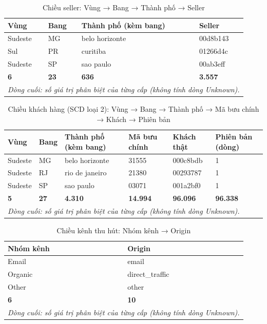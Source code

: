\begin{table}[htbp]\centering\scriptsize\caption{Chiều seller: Vùng → Bang → Thành phố → Seller}\label{tab:hier-dim-seller}
\begin{tabular}{llll}\toprule
\textbf{Vùng} & \textbf{Bang} & \textbf{Thành phố (kèm bang)} & \textbf{Seller}\\\midrule
Sudeste & MG & belo horizonte & 00d8b143\\
Sul & PR & curitiba & 01266d4c\\
Sudeste & SP & sao paulo & 00ab3eff\\
\midrule
\textbf{6} & \textbf{23} & \textbf{636} & \textbf{3.557}\\
\multicolumn{4}{l}{\footnotesize\emph{Dòng cuối: số giá trị phân biệt của từng cấp (không tính dòng Unknown).}}\\
\bottomrule\end{tabular}\end{table}

\begin{table}[htbp]\centering\scriptsize\caption{Chiều khách hàng (SCD loại 2): Vùng → Bang → Thành phố → Mã bưu chính → Khách → Phiên bản}\label{tab:hier-dim-customer}
\begin{tabular}{llllll}\toprule
\textbf{Vùng} & \textbf{Bang} & \textbf{Thành phố (kèm bang)} & \textbf{Mã bưu chính} & \textbf{Khách thật} & \textbf{Phiên bản (dòng)}\\\midrule
Sudeste & MG & belo horizonte & 31555 & 000c8bdb & 1\\
Sudeste & RJ & rio de janeiro & 21380 & 00293787 & 1\\
Sudeste & SP & sao paulo & 03071 & 001a2bf0 & 1\\
\midrule
\textbf{5} & \textbf{27} & \textbf{4.310} & \textbf{14.994} & \textbf{96.096} & \textbf{96.338}\\
\multicolumn{6}{l}{\footnotesize\emph{Dòng cuối: số giá trị phân biệt của từng cấp (không tính dòng Unknown).}}\\
\bottomrule\end{tabular}\end{table}

\begin{table}[htbp]\centering\scriptsize\caption{Chiều kênh thu hút: Nhóm kênh → Origin}\label{tab:hier-dim-lead-origin}
\begin{tabular}{ll}\toprule
\textbf{Nhóm kênh} & \textbf{Origin}\\\midrule
Email & email\\
Organic & direct\_traffic\\
Other & other\\
\midrule
\textbf{6} & \textbf{10}\\
\multicolumn{2}{l}{\footnotesize\emph{Dòng cuối: số giá trị phân biệt của từng cấp (không tính dòng Unknown).}}\\
\bottomrule\end{tabular}\end{table}

